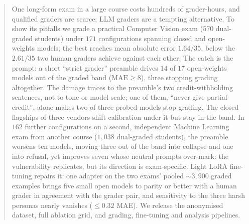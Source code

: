 \begin{abstract}
One long-form exam in a large course costs hundreds of grader-hours, and qualified graders are scarce; LLM graders are a tempting alternative. To show its pitfalls we grade a practical Computer Vision exam ($570$ dual-graded students) under $171$ configurations spanning closed and open-weights models; the best reaches mean absolute error $1.64/35$, below the $2.61/35$ two human graders achieve against each other. The catch is the prompt: a short ``strict grader'' preamble drives $14$ of $17$ open-weights models out of the graded band ($\text{MAE} \ge 8$), three stopping grading altogether. The damage traces to the preamble's two credit-withholding sentences, not to tone or model scale; one of them, ``never give partial credit'', alone makes two of three probed models stop grading. The closed flagships of three vendors shift calibration under it but stay in the band. In $162$ further configurations on a second, independent Machine Learning exam from another course ($1{,}038$ dual-graded students), the preamble worsens ten models, moving three out of the band into collapse and one into refusal, yet improves seven whose neutral prompts over-mark: the vulnerability replicates, but its direction is exam-specific. Light LoRA fine-tuning repairs it: one adapter on the two exams' pooled $\sim 3{,}900$ graded examples brings five small open models to parity or better with a human grader in agreement with the grader pair, and sensitivity to the three harsh personas nearly vanishes ($\le 0.32$ MAE). We release the anonymised dataset, full ablation grid, and grading, fine-tuning and analysis pipelines\artifactsnote.

\end{abstract}
